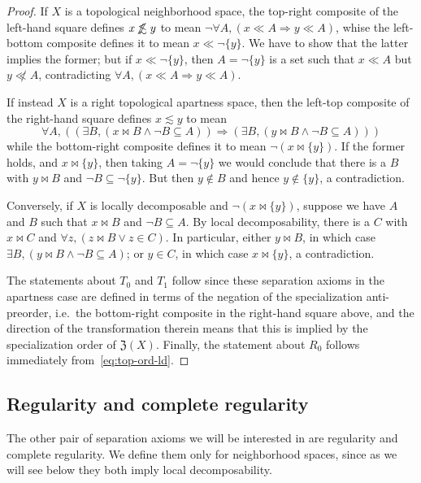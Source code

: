 \documentclass{article}
\def\oapt{\mathrel{\!\not\,\not\lesssim}}
\def\leapx{\lesssim}
\def\cpl#1{\neg #1}
\let\implies\Rightarrow
\def\singleton#1{\{#1\}}
\def\neigh{\mathfrak{Z}}
\begin{document}
\begin{proof}
  If $X$ is a topological neighborhood space, the top-right composite of the left-hand square defines $x\oapt y$ to mean $\neg \forall A, (x\ll A \implies y\ll A)$, whise the left-bottom composite defines it to mean $x\ll \cpl{\singleton{y}}$.
  We have to show that the latter implies the former; but if $x\ll \cpl{\singleton{y}}$, then $A = \cpl{\singleton{y}}$ is a set such that $x\ll A$ but $y\not\ll A$, contradicting $\forall A, (x\ll A \implies y\ll A)$.

  If instead $X$ is a right topological apartness space, then the left-top composite of the right-hand square defines $x\leapx y$ to mean
  \[\forall A, ((\exists B, (x\bowtie B \land \cpl{B} \subseteq A)) \implies(\exists B, (y\bowtie B \land \cpl{B} \subseteq A)))\]
  while the bottom-right composite defines it to mean $\neg (x\bowtie \singleton{y})$.
  If the former holds, and $x\bowtie\singleton{y}$, then taking $A=\cpl{\singleton{y}}$ we would conclude that there is a $B$ with $y\bowtie B$ and $\cpl{B} \subseteq \cpl{\singleton{y}}$.
  But then $y\notin B$ and hence $y\notin \singleton{y}$, a contradiction.

  Conversely, if $X$ is locally decomposable and $\neg (x\bowtie \singleton{y})$, suppose we have $A$ and $B$ such that $x\bowtie B$ and $\cpl{B} \subseteq A$.
  By local decomposability, there is a $C$ with $x\bowtie C$ and $\forall z, (z\bowtie B \lor z\in C)$.
  In particular, either $y\bowtie B$, in which case $\exists B, (y\bowtie B \land \cpl{B} \subseteq A)$; or $y\in C$, in which case $x\bowtie \singleton{y}$, a contradiction.

  The statements about $T_0$ and $T_1$ follow since these separation axioms in the apartness case are defined in terms of the negation of the specialization anti-preorder, i.e.\ the bottom-right composite in the right-hand square above, and the direction of the transformation therein means that this is implied by the specialization order of $\neigh(X)$.
  Finally, the statement about $R_0$ follows immediately from~\eqref{eq:top-ord-ld}.
\end{proof}


\subsection{Regularity and complete regularity}
\label{sec:regularity}

The other pair of separation axioms we will be interested in are regularity and complete regularity.
We define them only for neighborhood spaces, since as we will see below they both imply local decomposability.
\end{document}
